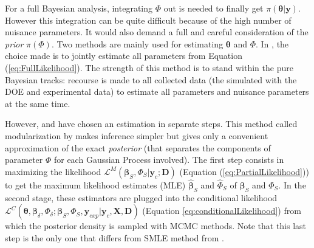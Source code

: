 \documentclass[soumission]{jsfds}
\newcommand{\prior}{\textit{prior }}
\newcommand{\EqRef}[1] {Equation (\ref{#1})}
\edef\hc{\string: }
\begin{document}

For a full Bayesian analysis, integrating $\Phi$ out is needed to finally get $\pi(\boldsymbol{\theta}|\boldsymbol{y})$. However this integration can be quite difficult because of the high number of nuisance parameters. It would also demand a full and careful consideration of the \prior $\pi(\Phi)$. Two methods are mainly used for estimating $\boldsymbol{\theta}$ and $\Phi$. In \citet{higdon2004}, the choice made is to jointly estimate all parameters from
\EqRef{eq:FullLikelihood}. The strength of this method is to stand within the pure Bayesian tracks\hc
 recourse is made to all collected data (the simulated with the DOE and experimental data) to estimate all parameters and nuisance parameters at the same time. \newline


However, \citet{kennedy2001} and \citet{bayarri2007} have chosen an estimation in separate steps. This method called modularization by \citet{liu2009} makes inference simpler but gives only a convenient approximation of the exact \textit{posterior} (that separates the components of parameter $\Phi$ for each Gaussian Process involved). The first step consists in maximizing the likelihood $\mathcal{L}^M(\boldsymbol{\beta}_S,\Phi_S|\boldsymbol{y}_c;\boldsymbol{D})$ (Equation (\ref{eq:PartialLikelihood})) to get the maximum likelihood estimates (MLE) $\hat{\boldsymbol{\beta}}_S$ and $\hat{\Phi}_S$ of $\boldsymbol{\beta}_S$ and $\Phi_S$.
In the second stage, these estimators are plugged into the conditional likelihood $\mathcal{L}^C(\boldsymbol{\theta},\boldsymbol{\beta}_{\delta},\Phi_{\delta};\boldsymbol{\beta}_S,\Phi_S,\boldsymbol{y}_{exp}|\boldsymbol{y}_c,\boldsymbol{X},\boldsymbol{D})$ (Equation \ref{eq:conditionalLikelihood}) from which the posterior density is sampled with MCMC methods. Note that this last step is the only one that differs from SMLE method from \citet{cox2001}.
\newline
\end{document}
